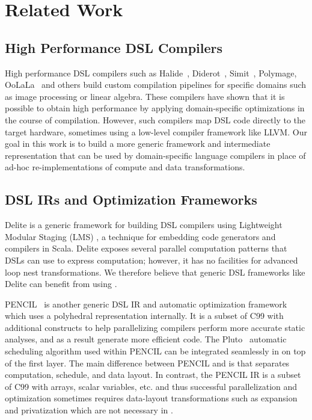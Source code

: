 \section{Related Work}

\subsection{High Performance DSL Compilers}

High performance DSL compilers such as Halide~\cite{DBLP:conf/pldi/Ragan-KelleyBAPDA13},
Diderot~\cite{diedrot_pldi12}, Simit~\cite{simit}, Polymage\cite{polymage}, OoLaLa~\cite{oolala_2000} and others build custom compilation pipelines for specific domains such as image processing or linear algebra.  These compilers have shown that it is possible to obtain high performance by  applying domain-specific optimizations in the course of compilation.  However, such compilers
map DSL code directly to the target hardware, sometimes using a low-level compiler framework like
LLVM.  Our goal in this work is to build a more generic framework and intermediate representation
that can be used by domain-specific language compilers in place of ad-hoc re-implementations of compute and data transformations.

\subsection{DSL IRs and Optimization Frameworks}

Delite \cite{chafi_domain-specific_2011} is a generic
framework for building DSL compilers
using  Lightweight Modular Staging (LMS) \cite{lms_staging_10}, a technique for embedding code generators and compilers in Scala.  Delite exposes several parallel computation patterns that DSLs can use to express computation; however, it has no facilities for advanced loop nest transformations. We therefore believe that generic DSL frameworks like Delite can benefit from using \framework.

PENCIL~\cite{pencil,pencil_paper} is another generic DSL IR and automatic optimization framework which uses a polyhedral representation internally.  It is a subset of C99 with additional constructs to help parallelizing compilers perform more accurate static analyses, and as a result generate more efficient code.  The Pluto~\cite{bondhugula_practical_2008} automatic scheduling algorithm used within PENCIL can be integrated seamlessly in \framework on top of the first layer.  The main difference between PENCIL and \framework is that \framework separates computation, schedule, and data layout.  In contrast, the PENCIL IR is a subset of C99 with arrays, scalar variables, etc. and thus successful parallelization and optimization sometimes requires data-layout transformations such as expansion and privatization which are not necessary in \framework.  %


